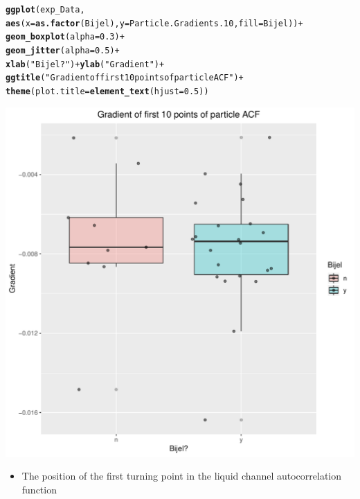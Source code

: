 \documentclass{article}\usepackage[]{graphicx}\usepackage[]{color}
\makeatletter
\def\maxwidth{ %
  \ifdim\Gin@nat@width>\linewidth
    \linewidth
  \else
    \Gin@nat@width
  \fi
}
\newcommand{\hlnum}[1]{\textcolor[rgb]{0.686,0.059,0.569}{#1}}%
\newcommand{\hlstr}[1]{\textcolor[rgb]{0.192,0.494,0.8}{#1}}%
\newcommand{\hlopt}[1]{\textcolor[rgb]{0,0,0}{#1}}%
\newcommand{\hlstd}[1]{\textcolor[rgb]{0.345,0.345,0.345}{#1}}%
\newcommand{\hlkwc}[1]{\textcolor[rgb]{0.333,0.667,0.333}{#1}}%
\newcommand{\hlkwd}[1]{\textcolor[rgb]{0.737,0.353,0.396}{\textbf{#1}}}%
\newenvironment{kframe}{%
 \def\at@end@of@kframe{}%
 \ifinner\ifhmode%
  \def\at@end@of@kframe{\end{minipage}}%
  \begin{minipage}{\columnwidth}%
 \fi\fi%
 \def\FrameCommand##1{\hskip\@totalleftmargin \hskip-\fboxsep
 \colorbox{shadecolor}{##1}\hskip-\fboxsep
     \hskip-\linewidth \hskip-\@totalleftmargin \hskip\columnwidth}%
 \MakeFramed {\advance\hsize-\width
   \@totalleftmargin\z@ \linewidth\hsize
   \@setminipage}}%
 {\par\unskip\endMakeFramed%
 \at@end@of@kframe}
\newenvironment{knitrout}{}{} %
\makeatother
\begin{document}
\begin{knitrout}
\begin{kframe}
\begin{alltt}
\hlkwd{ggplot}\hlstd{(exp_Data,}
       \hlkwd{aes}\hlstd{(}\hlkwc{x}\hlstd{=}\hlkwd{as.factor}\hlstd{(Bijel),} \hlkwc{y}\hlstd{=Particle.Gradients.10,} \hlkwc{fill}\hlstd{=Bijel))} \hlopt{+}
       \hlkwd{geom_boxplot}\hlstd{(}\hlkwc{alpha}\hlstd{=}\hlnum{0.3}\hlstd{)} \hlopt{+}
       \hlkwd{geom_jitter}\hlstd{(}\hlkwc{alpha}\hlstd{=}\hlnum{0.5}\hlstd{)} \hlopt{+}
       \hlkwd{xlab}\hlstd{(}\hlstr{"Bijel?"}\hlstd{)} \hlopt{+} \hlkwd{ylab}\hlstd{(}\hlstr{"Gradient"}\hlstd{)} \hlopt{+}
       \hlkwd{ggtitle}\hlstd{(}\hlstr{"Gradient of first 10 points of particle ACF"}\hlstd{)} \hlopt{+}
       \hlkwd{theme}\hlstd{(}\hlkwc{plot.title} \hlstd{=} \hlkwd{element_text}\hlstd{(}\hlkwc{hjust} \hlstd{=} \hlnum{0.5}\hlstd{))}
\end{alltt}
\end{kframe}
\includegraphics[width=\maxwidth]{figure/unnamed-chunk-2-2} 

\end{knitrout}

\begin{itemize}
\item The position of the first turning point in the liquid channel autocorrelation function
\end{itemize}
\end{document}

